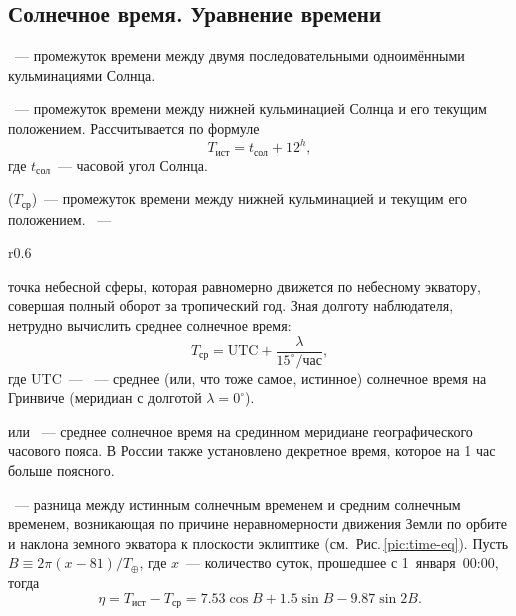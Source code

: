\subsection{Солнечное время. Уравнение времени}
~--- промежуток времени между двумя последовательными одноимёнными кульминациями Солнца.

~--- промежуток времени между нижней кульминацией Солнца и его текущим положением. Рассчитывается по формуле
\begin{equation}
	T_{\text{ист}} = t_{\text{сол}}+12^h,
\end{equation}
где $t_{\text{сол}}$~--- часовой угол Солнца.

 ($T_\text{ср}$)~--- промежуток времени между нижней
кульминацией  и текущим его положением. ~--- 
\begin{wrapfigure}[14]{r}{0.6\tw}
	\centering
	\vspace{-1pc}
	\caption{График уравнения времени}
	\label{pic:time-eq}
\end{wrapfigure}
точка небесной сферы, которая равномерно движется по небесному экватору, совершая полный оборот за тропический год. Зная долготу наблюдателя, нетрудно вычислить среднее солнечное время:
\begin{equation*}
T_\text{ср} = \text{UTC} + \frac{\lambda}{15^\circ/\text{час}},
\end{equation*}
где UTC~--- ~--- среднее (или, что тоже самое, истинное) солнечное время на Гринвиче (меридиан с долготой $\lambda = 0^\circ$).

 или ~--- среднее солнечное время на срединном меридиане географического часового пояса. В России также установлено декретное время, которое на 1 час больше поясного.

~--- разница между истинным солнечным временем и средним солнечным временем, возникающая по причине неравномерности движения Земли по орбите и наклона земного экватора к плоскости эклиптике (см.~Рис.\,\ref{pic:time-eq}). Пусть $B \equiv 2 \pi (x - 81)/T_\oplus$, где $x$~--- количество суток, прошедшее с 1~января~00:00, тогда
\begin{equation}
\eta = T_{\text{ист}} - T_\text{ср} = 7.53 \cos B + 1.5 \sin B - 9.87 \sin 2 B.
\end{equation}